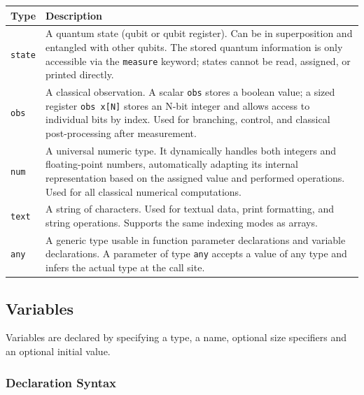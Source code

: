 \begin{center}
\begin{tabular}{|p{2cm}|p{10cm}|}
\hline
\textbf{Type} & \textbf{Description} \\
\hline
\texttt{state} &
    A quantum state (qubit or qubit register). Can be in superposition and
    entangled with other qubits. The stored quantum information is only
    accessible via the \texttt{measure} keyword; states cannot be read,
    assigned, or printed directly. \\
\hline
\texttt{obs} &
    A classical observation. A scalar \texttt{obs} stores a boolean value;
    a sized register \texttt{obs x[N]} stores an N-bit integer and allows
    access to individual bits by index. Used for branching, control, and
    classical post-processing after measurement. \\
\hline
\texttt{num} &
    A universal numeric type. It dynamically handles both integers 
    and floating-point numbers, automatically adapting its internal 
    representation based on the assigned value and performed operations. Used 
    for all classical numerical computations. \\
\hline
\texttt{text} &
    A string of characters. Used for textual data, print formatting, and string
    operations. Supports the same indexing modes as arrays. \\
\hline
\texttt{any} &
    A generic type usable in function parameter declarations and variable
    declarations. A parameter of type \texttt{any} accepts a value of any type
    and infers the actual type at the call site. \\
\hline
\end{tabular}
\end{center}

\subsection{Variables}\label{sec:variables}

Variables are declared by specifying a type, a name, optional size specifiers
 and an optional initial value.

\subsubsection{Declaration Syntax}



